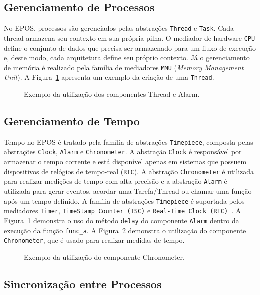 \documentclass[11pt,twocolumn]{article}
\newcommand{\prg}[3][ht!]{
  \begin{figure}[#1]
      
    \caption{#3\label{prg:#2}}
  \end{figure}
}
\begin{document}
\subsection{Gerenciamento de Processos}

No \textsc{EPOS}, processos são gerenciados pelas abstrações \texttt{Thread} e \texttt{Task}. Cada thread armazena seu contexto em sua própria pilha. O mediador de hardware \texttt{CPU} define o conjunto de dados que precisa ser armazenado para um fluxo de execução e, deste modo, cada arquitetura define seu próprio contexto. Já o gerenciamento de memória é realizado pela família de mediadores \texttt{MMU} (\textit{Memory Management Unit}). A Figura~\ref{prg:thread} apresenta um exemplo da criação de uma \texttt{Thread}.

\prg{thread}{Exemplo da utilização dos componentes Thread e Alarm.}

\subsection{Gerenciamento de Tempo}

Tempo no \textsc{EPOS} é tratado pela família de abstrações \texttt{Timepiece}, composta pelas abstrações \texttt{Clock}, \texttt{Alarm} e \texttt{Chronometer}. A abstração \texttt{Clock} é responsável por armazenar o tempo corrente e está disponível apenas em sistemas que possuem dispositivos de relógios de tempo-real (\texttt{RTC}). A abstração \texttt{Chronometer} é utilizada para realizar medições de tempo com alta precisão e a abstração \texttt{Alarm} é utilizada para gerar eventos, acordar uma Tarefa/Thread ou chamar uma função após um tempo definido. A família de abstrações \texttt{Timepiece} é suportada pelos mediadores \texttt{Timer}, \texttt{TimeStamp Counter (TSC)} e \texttt{Real-Time Clock (RTC)}~\cite{Froehlich:Timers:2011}. A Figura~\ref{prg:thread} demonstra o uso do método \texttt{delay} do componente \texttt{Alarm} dentro da execução da função \texttt{func\_a}. A Figura~\ref{prg:chron} demonstra o utilização do componente \texttt{Chronometer}, que é usado para realizar medidas de tempo.

\prg{chron}{Exemplo da utilização do componente Chronometer.}

\subsection{Sincronização entre Processos}
\end{document}
